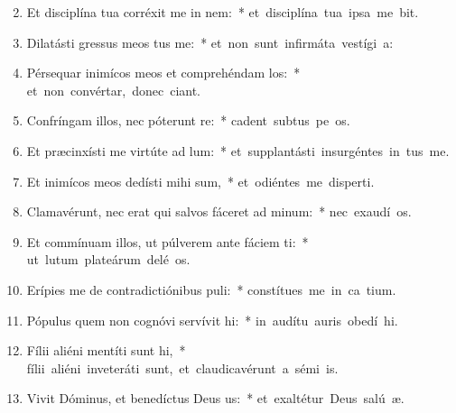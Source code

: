 \begin{flushleft}
\begin{enumerate}[leftmargin=*]
\setcounter{enumi}{1}

\item Et disciplína tua corréxit me in nem:~* \mbox{et disciplína tua ipsa me bit.}

\item Dilatásti gressus meos tus me:~* \mbox{et non sunt infirmáta vestígi a:}

\item Pérsequar inimícos meos et comprehéndam los:~* \mbox{et non convértar, donec ciant.}

\item Confríngam illos, nec póterunt re:~* \mbox{cadent subtus pe os.}

\item Et præcinxísti me virtúte ad lum:~* \mbox{et supplantásti insurgéntes in  tus me.}

\item Et inimícos meos dedísti mihi sum,~* \mbox{et odiéntes me disperti.}

\item Clamavérunt, nec erat qui salvos fáceret ad minum:~* \mbox{nec exaudí os.}

\item Et commínuam illos, ut púlverem ante fáciem ti:~* \mbox{ut lutum plateárum delé os.}

\item Erípies me de contradictiónibus puli:~* \mbox{constítues me in ca tium.}

\item Pópulus quem non cognóvi servívit hi:~* \mbox{in audítu auris obedí hi.}

\item Fílii aliéni mentíti sunt hi,~* \mbox{fílii aliéni inveteráti sunt, et claudicavérunt a sémi is.}

\item Vivit Dóminus, et benedíctus Deus us:~* \mbox{et exaltétur Deus salú æ.}


\end{enumerate}
\end{flushleft}
